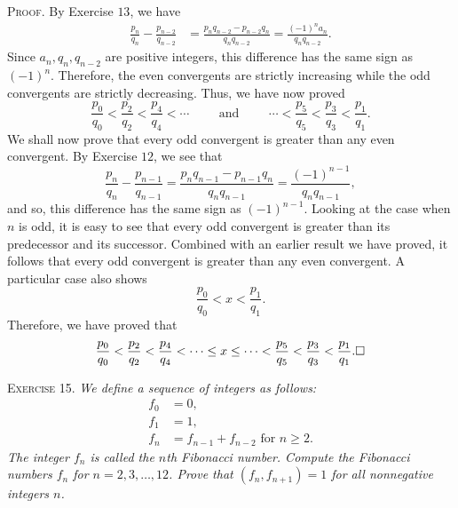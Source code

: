 \documentclass[11pt, leqno]{article}
\newcommand{\done}{\ensuremath{\hfill\square}}
\begin{document}
\textsc{Proof}. By Exercise $13$, we have 
\begin{align*}
\frac{p_n}{q_n} - \frac{p_{n-2}}{q_{n-2}} &= \frac{p_nq_{n-2} - p_{n-2}q_n}{q_nq_{n-2}} = \frac{(-1)^n a_n}{q_nq_{n-2}}.
\end{align*}
Since $a_n, q_n, q_{n-2}$ are positive integers, this difference has the same sign as $(-1)^n$. Therefore, the even convergents are strictly increasing while the odd convergents are strictly decreasing. Thus, we have now proved 
\begin{displaymath}
\frac{p_0}{q_0} < \frac{p_2}{q_2} < \frac{p_4}{q_4} < \cdots \hspace{1cm}\text{and}\hspace{1cm} \cdots < \frac{p_5}{q_5} < \frac{p_3}{q_3} < \frac{p_1}{q_1}.
\end{displaymath}
We shall now prove that every odd convergent is greater than any even convergent. By Exercise $12$, we see that 
\begin{displaymath}
\frac{p_n}{q_n} - \frac{p_{n-1}}{q_{n-1}} = \frac{p_nq_{n-1} - p_{n-1}q_n}{q_nq_{n-1}} = \frac{(-1)^{n-1}}{q_nq_{n-1}},
\end{displaymath}
and so, this difference has the same sign as $(-1)^{n-1}$. Looking at the case when $n$ is odd, it is easy to see that every odd convergent is greater than its predecessor and its successor. Combined with an earlier result we have proved, it follows that every odd convergent is greater than any even convergent. A particular case also shows 
\begin{displaymath}
\frac{p_0}{q_0} < x < \frac{p_1}{q_1}.
\end{displaymath}
Therefore, we have proved that 
\begin{displaymath}
\frac{p_0}{q_0} < \frac{p_2}{q_2} < \frac{p_4}{q_4} < \cdots \leq x \leq \cdots < \frac{p_5}{q_5} < \frac{p_3}{q_3} < \frac{p_1}{q_1}. \done
\end{displaymath}

\textsc{Exercise 15}. \emph{We define a sequence of integers as follows: 
\begin{align*}
  f_0 &= 0,\\
  f_1 &= 1,\\
  f_n &= f_{n-1} + f_{n-2} \text{ for } n\geq 2.
\end{align*}The integer $f_n$ is called the $n$th Fibonacci number. Compute the Fibonacci numbers $f_n$ for $n= 2,3,\ldots, 12$. Prove that $(f_n, f_{n+1}) = 1$ for all nonnegative integers $n$.}
\end{document}
